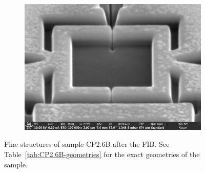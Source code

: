 \begin{figure}[ht]
\begin{subfigure}[t]{0.3\textwidth}
	\end{subfigure}
	\hfill
	\begin{subfigure}[t]{0.3\textwidth}
		\centering
		\includegraphics[width=\textwidth]{figures/samples/CP2/CP2.6B_SEM_SQUID.jpg}
	\end{subfigure}

	\caption{Fine structures of sample CP2.6B after the FIB. See Table~\ref{tab:CP2.6B-geometries} for the exact geometries of the sample.}
	\label{fig:CP2.6B-SEM-images}
\end{figure}

